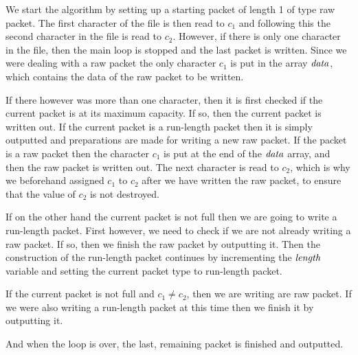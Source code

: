 We start the algorithm by setting up a starting packet of length 1 of
type raw packet. The first character of the file is then read to $c_1$
and following this the second character in the file is read to
$c_2$. However, if there is only one character in the file, then the
main loop is stopped and the last packet is written. Since we were
dealing with a raw packet the only character $c_1$ is put in the array
$\mathit{data}$, which contains the data of the raw packet to be written.

If there however was more than one character, then it is first checked
if the current packet is at its maximum capacity. If so, then the
current packet is written out. If the current packet is a run-length
packet then it is simply outputted and preparations are made for
writing a new raw packet. If the packet is a raw packet then the
character $c_1$ is put at the end of the $\mathit{data}$ array, and then
the raw packet is written out. The next character is read to $c_2$,
which is why we beforehand assigned $c_1$ to $c_2$ after we have
written the raw packet, to ensure that the value of $c_2$ is not
destroyed.

If on the other hand the current packet is not full then we are going
to write a run-length packet. First however, we need to check if we
are not already writing a raw packet. If so, then we finish the raw
packet by outputting it. Then the construction of the run-length
packet continues by incrementing the $\mathit{length}$ variable and setting the
current packet type to run-length packet.

If the current packet is not full and $c_1 \neq c_2$, then we are
writing are raw packet. If we were also writing a run-length packet at
this time then we finish it by outputting it.

And when the loop is over, the last, remaining packet is finished and
outputted.


